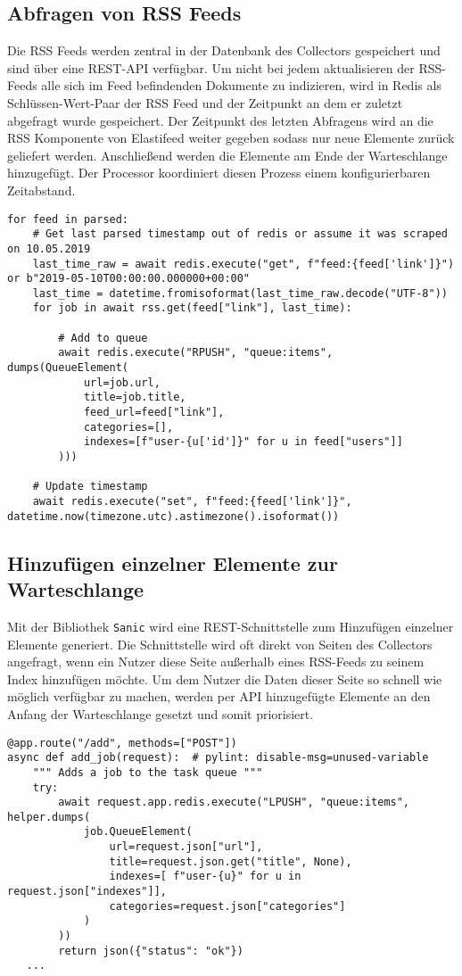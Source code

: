 \subsection{Abfragen von RSS Feeds}
Die RSS Feeds werden zentral in der Datenbank des Collectors gespeichert und sind über eine REST-API verfügbar.
Um nicht bei jedem aktualisieren der RSS-Feeds alle sich im Feed befindenden Dokumente zu indizieren, wird in Redis als Schlüssen-Wert-Paar der RSS Feed und der Zeitpunkt an dem er zuletzt abgefragt wurde gespeichert.
Der Zeitpunkt des letzten Abfragens wird an die RSS Komponente von Elastifeed weiter gegeben sodass nur neue Elemente zurück geliefert werden.
Anschließend werden die Elemente am Ende der Warteschlange hinzugefügt.
Der Processor koordiniert diesen Prozess einem konfigurierbaren Zeitabstand.
\begin{lstlisting}
for feed in parsed:
    # Get last parsed timestamp out of redis or assume it was scraped on 10.05.2019
    last_time_raw = await redis.execute("get", f"feed:{feed['link']}") or b"2019-05-10T00:00:00.000000+00:00"
    last_time = datetime.fromisoformat(last_time_raw.decode("UTF-8"))
    for job in await rss.get(feed["link"], last_time):

        # Add to queue
        await redis.execute("RPUSH", "queue:items", dumps(QueueElement(
            url=job.url,
            title=job.title,
            feed_url=feed["link"],
            categories=[],
            indexes=[f"user-{u['id']}" for u in feed["users"]]
        )))

    # Update timestamp
    await redis.execute("set", f"feed:{feed['link']}", datetime.now(timezone.utc).astimezone().isoformat())
\end{lstlisting}
\endsubsection

\subsection{Hinzufügen einzelner Elemente zur Warteschlange}
Mit der Bibliothek \texttt{Sanic} wird eine REST-Schnittstelle zum Hinzufügen einzelner Elemente generiert.
Die Schnittstelle wird oft direkt von Seiten des Collectors angefragt, wenn ein Nutzer diese Seite außerhalb eines RSS-Feeds zu seinem Index hinzufügen möchte.
Um dem Nutzer die Daten dieser Seite so schnell wie möglich verfügbar zu machen, werden per API hinzugefügte Elemente an den Anfang der Warteschlange gesetzt und somit priorisiert.
\begin{lstlisting}
@app.route("/add", methods=["POST"])
async def add_job(request):  # pylint: disable-msg=unused-variable
    """ Adds a job to the task queue """
    try:
        await request.app.redis.execute("LPUSH", "queue:items", helper.dumps(
            job.QueueElement(
                url=request.json["url"],
                title=request.json.get("title", None),
                indexes=[ f"user-{u}" for u in request.json["indexes"]],
                categories=request.json["categories"]
            )
        ))
        return json({"status": "ok"})
   ...
\end{lstlisting}
\endsubsection

\endsection
